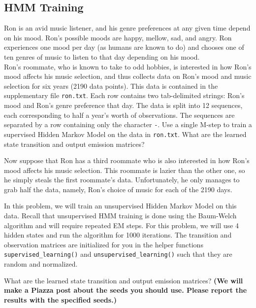 \subsection{HMM Training}
Ron is an avid music listener, and his genre preferences at any given time depend on his mood. Ron's possible moods are happy, mellow, sad, and angry. Ron experiences one mood per day (as humans are known to do) and chooses one of ten genres of music to listen to that day depending on his mood. \\

Ron's roommate, who is known to take to odd hobbies, is interested in how Ron's mood affects his music selection, and thus collects data on Ron's mood and music selection for six years (2190 data points). This data is contained in the supplementary file \texttt{ron.txt}. Each row contains two tab-delimited strings: Ron's mood and Ron's genre preference that day. The data is split into 12 sequences, each corresponding to half a year's worth of observations. The sequences are separated by a row containing only the character \texttt{-}.
\noindent\problem[10] %
Use a single M-step to train a supervised Hidden Markov Model on the data in \texttt{ron.txt}. What are the learned state transition and output emission matrices?
\begin{subsolution}
	
\end{subsolution}
\newpage

\indent\problem[15] %
Now suppose that Ron has a third roommate who is also interested in how Ron's mood affects his music selection. This roommate is lazier than the other one, so he simply steals the first roommate's data. Unfortunately, he only manages to grab half the data, namely, Ron's choice of music for each of the 2190 days.

In this problem, we will train an unsupervised Hidden Markov Model on this data. Recall that unsupervised HMM training is done using the Baum-Welch algorithm and will require repeated EM steps. For this problem, we will use 4 hidden states and run the algorithm for 1000 iterations. The transition and observation matrices are initialized for you in the helper functions \texttt{supervised\_learning()} and \texttt{unsupervised\_learning()} such that they are random and normalized.

What are the learned state transition and output emission matrices? \textbf{(We will make a Piazza post about the seeds you should use. Please report the results with the specified seeds.)}
\begin{subsolution}
	
\end{subsolution}
\newpage

